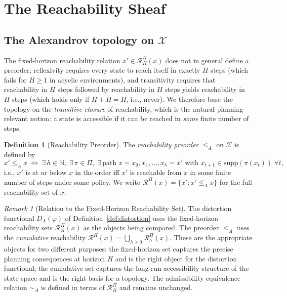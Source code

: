 \documentclass[11pt, a4paper]{article}
\theoremstyle{plain}
\theoremstyle{definition}
\newtheorem{definition}[theorem]{Definition}
\theoremstyle{remark}
\newtheorem{remark}[theorem]{Remark}
\newcommand{\N}{\mathbb{N}}
\newcommand{\calX}{\mathcal{X}}
\newcommand{\calR}{\mathcal{R}}
\newcommand{\simA}{\sim_{\!A}}
\newcommand{\RHP}{\mathcal{R}_{H}^{\Pi}}
\newcommand{\DA}{D_{A}(\varphi)}
\begin{document}
\section{The Reachability Sheaf}
\label{sec:sheaf}

\subsection{The Alexandrov topology on $\calX$}

The fixed-horizon reachability relation $x' \in \RHP(x)$ does not in general
define a preorder: reflexivity requires every state to reach itself in exactly
$H$ steps (which fails for $H \geq 1$ in acyclic environments), and transitivity
requires that reachability in $H$ steps followed by reachability in $H$ steps
yields reachability in $H$ steps (which holds only if $H + H = H$, i.e., never).
We therefore base the topology on the \emph{transitive closure} of reachability,
which is the natural planning-relevant notion: a state is accessible if it can
be reached in \emph{some} finite number of steps.

\begin{definition}[Reachability Preorder]
\label{def:reach_preorder}
The \emph{reachability preorder} $\leq_A$ on $\calX$ is defined by
\[
  x' \leq_A x \;\iff\;
  \exists\, h \in \N,\;\exists\,\pi \in \Pi,\;
  \exists\,\text{path } x = x_0, x_1, \ldots, x_h = x'
  \text{ with } x_{t+1} \in \mathrm{supp}(\pi(x_t))\;\forall t,
\]
i.e., $x'$ is at or below $x$ in the order iff $x'$ is reachable from $x$
in some finite number of steps under some policy. We write
$\calR^\Pi(x) = \{x' : x' \leq_A x\}$ for the full reachability set of $x$.
\end{definition}

\begin{remark}[Relation to the Fixed-Horizon Reachability Set]
The distortion functional $\DA$ of Definition~\ref{def:distortion} uses the
fixed-horizon reachability sets $\RHP(x)$ as the objects being compared. The
preorder $\leq_A$ uses the \emph{cumulative} reachability $\calR^\Pi(x) =
\bigcup_{h \geq 0} \mathcal{R}_h^\Pi(x)$. These are the appropriate objects
for two different purposes: the fixed-horizon set captures the precise
planning consequences at horizon $H$ and is the right object for the distortion
functional; the cumulative set captures the long-run accessibility structure
of the state space and is the right basis for a topology. The admissibility
equivalence relation $\simA$ is defined in terms of $\RHP$ and remains
unchanged.
\end{remark}
\end{document}
